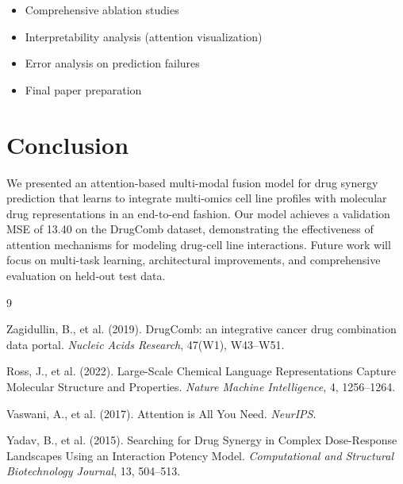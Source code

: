 \documentclass[10pt,twocolumn]{article}
\begin{document}
\begin{itemize}
    \item[$\square$] Comprehensive ablation studies
    \item[$\square$] Interpretability analysis (attention visualization)
    \item[$\square$] Error analysis on prediction failures
    \item[$\square$] Final paper preparation
\end{itemize}

\section{Conclusion}

We presented an attention-based multi-modal fusion model for drug synergy prediction that learns to integrate multi-omics cell line profiles with molecular drug representations in an end-to-end fashion. Our model achieves a validation MSE of 13.40 on the DrugComb dataset, demonstrating the effectiveness of attention mechanisms for modeling drug-cell line interactions. Future work will focus on multi-task learning, architectural improvements, and comprehensive evaluation on held-out test data.


\begin{thebibliography}{9}

Zagidullin, B., et al. (2019). DrugComb: an integrative cancer drug combination data portal. \textit{Nucleic Acids Research}, 47(W1), W43--W51.

Ross, J., et al. (2022). Large-Scale Chemical Language Representations Capture Molecular Structure and Properties. \textit{Nature Machine Intelligence}, 4, 1256--1264.

Vaswani, A., et al. (2017). Attention is All You Need. \textit{NeurIPS}.

Yadav, B., et al. (2015). Searching for Drug Synergy in Complex Dose-Response Landscapes Using an Interaction Potency Model. \textit{Computational and Structural Biotechnology Journal}, 13, 504--513.

\end{thebibliography}
\end{document}

